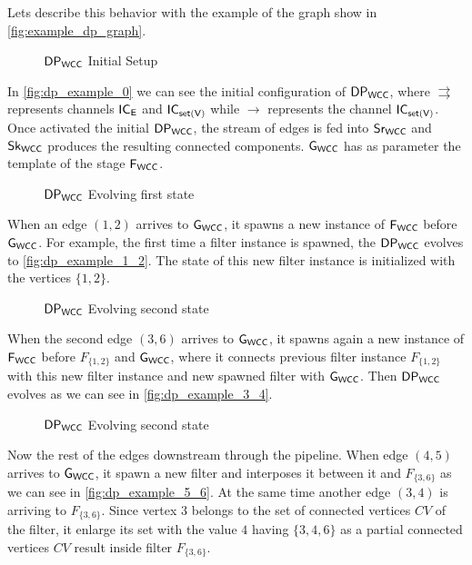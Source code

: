 Lets describe this behavior with the example of the graph show in \autoref{fig:example_dp_graph}.

\begin{figure}[h!]
  \centering
{}
\caption[$\dpwcc$ Initial Setup]{$\dpwcc$ Initial Setup}
\label{fig:dp_example_0}
\end{figure}

In \autoref{fig:dp_example_0} we can see the initial configuration of $\dpwcc$, where $\rightrightarrows$ represents channels $\mathsf{IC_E}$ and $\mathsf{IC_{set(V)}}$ while $\rightarrow$ represents the channel $\mathsf{IC_{set(V)}}$.
Once activated the initial $\dpwcc$, the stream of edges is fed into $\mathsf{Sr_{WCC}}$ and $\mathsf{Sk_{WCC}}$ produces the resulting connected components. 
$\mathsf{G_{WCC}}$ has as parameter the template of the stage  $\mathsf{F_{WCC}}$. 
 
 \begin{figure}[h!]
  \centering
  \caption[$\dpwcc$ Evolving first state]{$\dpwcc$ Evolving first state}
  \label{fig:dp_example_1_2}
\end{figure}
 
When an edge $(1,2)$ arrives to $\mathsf{G_{WCC}}$, it  spawns a new instance of $\mathsf{F_{WCC}}$ before $\mathsf{G_{WCC}}$. 
For example, the first time a filter instance is spawned, the $\dpwcc$ evolves to \autoref{fig:dp_example_1_2}. 
The state of this new filter instance is initialized with the vertices $\{1,2\}$. 

\begin{figure}[h!]
  \centering
  \caption[$\dpwcc$ Evolving second state]{$\dpwcc$ Evolving second state}
  \label{fig:dp_example_3_4}
\end{figure}

When the second edge $(3,6)$ arrives to $\mathsf{G_{WCC}}$, it spawns again a new instance of $\mathsf{F_{WCC}}$ before $F_{\{1,2\}}$ and $\mathsf{G_{WCC}}$, where it connects previous filter instance $F_{\{1,2\}}$ with this new filter instance and new spawned filter with $\mathsf{G_{WCC}}$. 
Then $\dpwcc$ evolves as we can see in \autoref{fig:dp_example_3_4}.

\begin{figure}[h!]
  \centering
  \caption[$\dpwcc$ Evolving third state]{$\dpwcc$ Evolving second state}
  \label{fig:dp_example_5_6}
\end{figure}

Now the rest of the edges downstream through the pipeline. When edge $(4,5)$ arrives to $\mathsf{G_{WCC}}$, it spawn a new filter and interposes it between it and $F_{\{3,6\}}$ as we can see in \autoref{fig:dp_example_5_6}.
At the same time another edge $(3,4)$ is arriving to $F_{\{3,6\}}$. Since vertex $3$ belongs to the set of connected vertices $CV$ of the filter, it enlarge its set with the value $4$ having $\{3,4,6\}$ as a partial connected vertices $CV$ result inside filter $F_{\{3,6\}}$.

